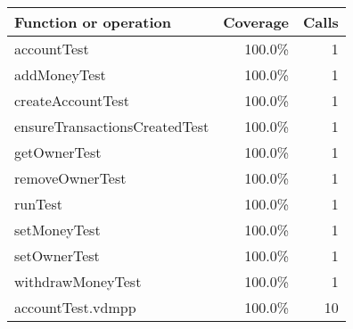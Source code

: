 \documentclass[a4paper]{article}
\begin{document}
\bigskip
\begin{longtable}{|l|r|r|}
\hline
Function or operation & Coverage & Calls \\
\hline
\hline
accountTest & 100.0\% & 1 \\
\hline
addMoneyTest & 100.0\% & 1 \\
\hline
createAccountTest & 100.0\% & 1 \\
\hline
ensureTransactionsCreatedTest & 100.0\% & 1 \\
\hline
getOwnerTest & 100.0\% & 1 \\
\hline
removeOwnerTest & 100.0\% & 1 \\
\hline
runTest & 100.0\% & 1 \\
\hline
setMoneyTest & 100.0\% & 1 \\
\hline
setOwnerTest & 100.0\% & 1 \\
\hline
withdrawMoneyTest & 100.0\% & 1 \\
\hline
\hline
accountTest.vdmpp & 100.0\% & 10 \\
\hline
\end{longtable}
\end{document}
